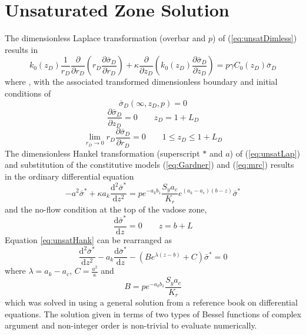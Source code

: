 \documentclass[12pt,letterpaper]{article}
\begin{document}
\section{Unsaturated Zone Solution}
The dimensionless Laplace transformation (overbar and $p$) of (\ref{eq:unsatDimless}) results in
\begin{equation}
  \label{eq:unsatLap}
   k_0(z_D) \frac{1}{r_D} \frac{\partial}{\partial r_D} \left( r_D\frac{\partial \bar{\sigma}_D}{\partial r_D} \right) +\kappa \frac{\partial}{\partial z_D} \left( k_0(z_D) \frac{\partial \bar{\sigma}_D}{\partial z_D}\right) = p \gamma C_0(z_D)  \bar{\sigma}_D
\end{equation}
where , with the associated transformed dimensionless boundary and initial conditions of
\begin{equation}\nonumber
 \bar{\sigma}_D(\infty,z_D,p) = 0
\end{equation}
\begin{equation}\nonumber
 \frac{\partial \bar{\sigma}_D}{\partial z_D}=0 \qquad z_D=1+L_D
\end{equation}
 \begin{equation}\nonumber
\lim_{r_D \rightarrow 0} r_D \frac{\partial \bar{\sigma}_D}{\partial r_D} = 0 \qquad 1\le z_D \le 1+L_D
\end{equation}
The dimensionless Hankel transformation (superscript $\ast$ and $a$) of (\ref{eq:unsatLap}) and substitution of the constitutive models (\ref{eq:Gardner}) and (\ref{eq:mrc}) results in the ordinary differential equation
\begin{equation}
  \label{eq:unsatHank}
   -a^2 \bar{\sigma}^{\ast} + \kappa a_k \frac{\mathrm{d}^2 \bar{\sigma}^{\ast}}{\mathrm{d} z^2}  = p e^{-a_k b_1} \frac{S_y a_c} {K_r}  e^{\left(a_k -a_c \right)\left( b - z\right)} \bar{\sigma}^{\ast} 
\end{equation}
and the no-flow condition at the top of the vadose zone, 
\begin{equation}\nonumber
 \frac{\mathrm{d}\bar{\sigma}^{\ast}}{\mathrm{d}z}=0 \qquad z=b+L 
\end{equation}
Equation \ref{eq:unsatHank} can be rearranged as
\begin{equation}
  \label{eq:mn-d5}
  \frac{\mathrm{d}^2 \bar{\sigma}^{\ast}}{\mathrm{d}z^2} - a_k \frac{\mathrm{d} \bar{\sigma}^{\ast}}{\mathrm{d}z} - \left( B e^{\lambda (z-b)} + C\right) \bar{\sigma}^{\ast}=0
\end{equation}
where $\lambda = a_k-a_c$, $C=\frac{a^2}{\kappa}$ and
\begin{equation}\nonumber
B = p e^{-a_k b_1} \frac{S_y a_c} {K_r} 
\end{equation}
which was solved in \cite{mishra10} using a general solution from a
reference book on differential equations.  The solution given in terms
of two types of Bessel functions of complex argument and non-integer
order is non-trivial to evaluate numerically. 
\end{document}
